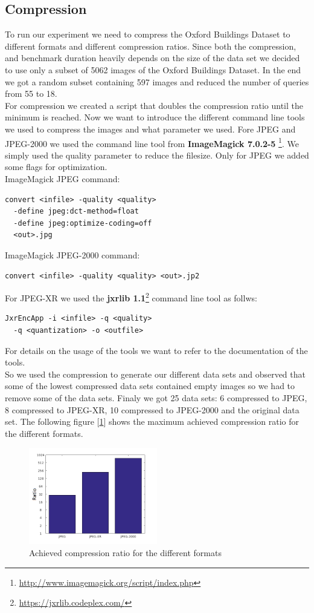 \documentclass[10pt,a4paper,twocolumn]{article}
\begin{document}
\subsection{Compression}
To run our experiment we need to compress the Oxford Buildings Dataset to different formats and different compression ratios. Since both the compression, and benchmark duration heavily depends on the size of the data set we decided to use only a subset of 5062 images of the Oxford Buildings Dataset. In the end we got a random subset containing 597 images and reduced the number of queries from 55 to 18.\\
For compression we created a script that doubles the compression ratio until the minimum is reached. Now we want to introduce the different command line tools we used to compress the images and what parameter we used.
Fore JPEG and JPEG-2000 we used the command line tool from \textbf{ImageMagick 7.0.2-5} \footnote{\url{http://www.imagemagick.org/script/index.php}}. We simply used the quality parameter to reduce the filesize. Only for JPEG we added some flags for optimization.\\
ImageMagick JPEG command:
\begin{lstlisting}
convert <infile> -quality <quality>
  -define jpeg:dct-method=float 
  -define jpeg:optimize-coding=off
  <out>.jpg
\end{lstlisting}
ImageMagick JPEG-2000 command:
\begin{lstlisting}
convert <infile> -quality <quality> <out>.jp2
\end{lstlisting}
For JPEG-XR we used the \textbf{jxrlib 1.1}\footnote{\url{https://jxrlib.codeplex.com/}} command line tool as follws:
\begin{lstlisting}
JxrEncApp -i <infile> -q <quality> 
  -q <quantization> -o <outfile>
\end{lstlisting}
For details on the usage of the tools we want to refer to the documentation of the tools.\\
So we used the compression to generate our different data sets and observed that some of the lowest compressed data sets contained empty images so we had to remove some of the data sets.
Finaly we got 25 data sets: 6 compressed to JPEG, 8 compressed to JPEG-XR, 10 compressed to JPEG-2000 and the original data set. The following figure [\ref{fig:compression}] shows the maximum achieved compression ratio for the different formats.\\
\begin{figure}
\includegraphics[width=0.5\textwidth]{img/compression.png}
	\caption{Achieved compression ratio for the different formats}
  \label{fig:compression}
\end{figure}
\end{document}
